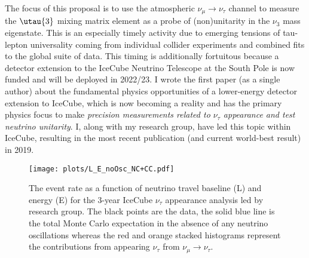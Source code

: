\documentclass[a4paper,11pt]{article}
\begin{document}
The focus of this proposal is to use the atmospheric $\nu_\mu \rightarrow \nu_\tau$ channel to measure the $\utau{3}$ mixing matrix element as a probe of (non)unitarity in the $\nu_3$ mass eigenstate. This is an especially timely activity due to emerging tensions of tau-lepton universality coming from individual collider experiments \cite{Abdesselam:2019dgh, Lees:2012xj, Aaij:2017deq} and combined fits to the global suite of data\cite{Amhis:2019ckw}. This timing is additionally fortuitous because a detector extension to the IceCube Neutrino Telescope at the South Pole is now funded and will be deployed in 2022/23. I wrote the first paper\cite{Koskinen:2011zz} (as a single author) about the fundamental physics opportunities of a lower-energy detector extension to IceCube, which is now becoming a reality and has the primary physics focus to make \emph{precision measurements related to $\nu_\tau$ appearance and test neutrino unitarity}. I, along with my research group, have led this topic within IceCube, resulting in the most recent publication (and current world-best result) in 2019\cite{Aartsen:2019tjl}. 

\begin{wrapfigure}[21]{c}{0.55\textwidth}
\vspace{-0.65cm}
\centering
\texttt{[image: plots/L\_E\_noOsc\_NC+CC.pdf]}
\caption{\label{fig:GRECO} The event rate as a function of neutrino travel baseline (L) and energy (E) for the 3-year IceCube $\nu_\tau$ appearance analysis led by research group. The black points are the data, the solid blue line is the total Monte Carlo expectation in the absence of any neutrino oscillations whereas the red and orange stacked histograms represent the contributions from appearing $\nu_\tau$ from $\nu_\mu \rightarrow \nu_\tau$.}
\end{wrapfigure}
\end{document}
